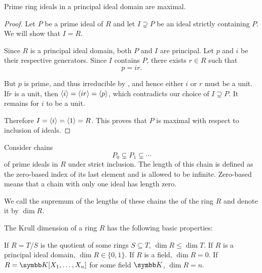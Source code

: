 \begin{proposition}\label{thm:prime_ideals_are_maximal_in_pid}
  Prime ring ideals in a principal ideal domain are maximal.
\end{proposition}
\begin{proof}
  Let \( P \) be a prime ideal of \( R \) and let \( I \supsetneq P \) be an ideal strictly containing \( P \). We will show that \( I = R \).

  Since \( R \) is a principal ideal domain, both \( P \) and \( I \) are principal. Let \( p \) and \( i \) be their respective generators. Since \( I \) contains \( P \), there exists \( r \in R \) such that
  \begin{equation*}
    p = ir.
  \end{equation*}

  But \( p \) is prime, and thus irreducible by , and hence either \( i \) or \( r \) must be a unit. If\LEM \( r \) is a unit, then \( \left\langle i \right\rangle = \left\langle ir \right\rangle = \left\langle p \right\rangle \), which contradicts our choice of \( I \supsetneq P \). It remains for \( i \) to be a unit.

  Therefore \( I = \left\langle i \right\rangle = \left\langle 1 \right\rangle = R \). This proves that \( P \) is maximal with respect to inclusion of ideals.
\end{proof}

\begin{definition}\label{def:krull_dimension}\cite[67]{Коцев2016}
  Consider chains
  \begin{equation*}
    P_0 \subsetneq P_1 \subsetneq \cdots
  \end{equation*}
  of prime ideals in \( R \) under strict inclusion. The length of this chain is defined as the zero-based index of its last element and is allowed to be infinite. Zero-based means that a chain with only one ideal has length zero.

  We call the supremum of the lengths of these chains the  of the ring \( R \) and denote it by \( \dim R \).
\end{definition}

\begin{proposition}\label{thm:krull_dimension_properties}
  The Krull dimension of a ring \( R \) has the following basic properties:
  \begin{propenum}
     If \( R = T / S \) is the quotient of some rings \( S \subseteq T \), \( \dim R \leq \dim T \).
     If \( R \) is a principal ideal domain, \( \dim R \in \{ 0, 1 \} \).
     If \( R \) is a field, \( \dim R = 0 \).
    \cite[exercise 8.19]{Коцев2016} If \( R = \BK[X_1, \ldots, X_n] \) for some field \( \BK \), \( \dim R = n \).
  \end{propenum}
\end{proposition}

